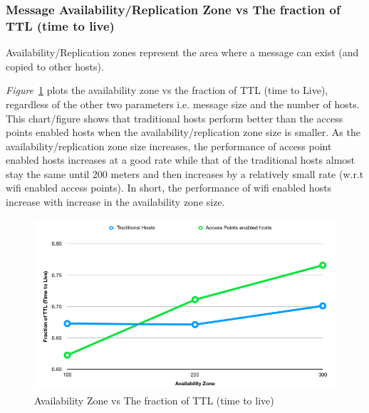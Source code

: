 \subsubsection{Message Availability/Replication Zone vs The fraction of TTL (time to live)}
Availability/Replication zones represent the area where a message can exist (and copied to other hosts). {\emph{Figure}~\ref{fig:scenario1_availability_zone} plots the availability zone vs the fraction of TTL (time to Live), regardless of the other two parameters i.e. message size and the number of hosts. This chart/figure shows that traditional hosts perform better than the access points enabled hosts when the availability/replication zone size is smaller. As the availability/replication zone size increases, the performance of access point enabled hosts increases at a good rate while that of the traditional hosts almost stay the same until 200 meters and then increases by a relatively small rate (w.r.t wifi enabled access points). In short, the performance of wifi enabled hosts increase with increase in the availability zone size.
\begin{figure}[h!]
  \centering
  \includegraphics[scale=0.43]{./figures/scenario1_availability_zone}
  \caption{Availability Zone vs The fraction of TTL (time to live)}
  \label{fig:scenario1_availability_zone}
\end{figure}
}
